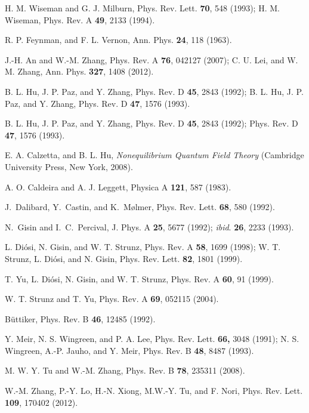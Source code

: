 \documentclass[preprint]{elsarticle}
\begin{document}
\begin{thebibliography}{10}
H. M. Wiseman and G. J. Milburn, Phys. Rev. Lett. \textbf{70},
548 (1993); H. M. Wiseman, Phys. Rev. A \textbf{49}, 2133 (1994).


R. P. Feynman, and F. L. Vernon, Ann. Phys.
\textbf{24}, 118 (1963).

J.-H. An and W.-M. Zhang, Phys. Rev. A \textbf{76},
042127 (2007); C. U. Lei, and W. M. Zhang, Ann. Phys. \textbf{327},
1408 (2012).

B. L. Hu, J. P. Paz, and Y. Zhang, Phys. Rev. D \textbf{45},
2843 (1992); B. L. Hu, J. P. Paz, and Y. Zhang, Phys. Rev. D \textbf{47},
1576 (1993).

B. L. Hu, J. P. Paz, and Y. Zhang, Phys. Rev. D \textbf{45},
2843 (1992); Phys. Rev. D \textbf{47}, 1576 (1993).

E. A. Calzetta, and B. L. Hu, \emph{Nonequilibrium Quantum
Field Theory} (Cambridge University Press, New York, 2008).

A. O. Caldeira and A. J. Leggett, Physica A \textbf{121},
587 (1983).

J.~Dalibard, Y.~Castin, and K.~M\o{}lmer,
Phys. Rev. Lett. \textbf{68}, 580 (1992).

N.~Gisin and I.~C.~Percival, J. Phys.
A \textbf{25}, 5677 (1992); \textit{ibid}. \textbf{26}, 2233 (1993).


L. Di\'{o}si, N. Gisin, and W. T. Strunz, Phys. Rev.
A \textbf{58}, 1699 (1998); W. T. Strunz, L. Di\'{o}si, and N. Gisin,
Phys. Rev. Lett. \textbf{82}, 1801 (1999).

T. Yu, L. Di\'{o}si, N. Gisin, and W. T. Strunz,
Phys. Rev. A \textbf{60}, 91 (1999).

W. T. Strunz and T. Yu, Phys. Rev. A \textbf{69},
052115 (2004).


B\"{u}ttiker, Phys. Rev. B \textbf{46}, 12485
(1992).

 Y. Meir, N. S. Wingreen, and P. A. Lee, Phys. Rev. Lett. {\bf 66,} 3048 (1991);
N. S. Wingreen, A.-P. Jauho, and Y. Meir, Phys. Rev.
B \textbf{48}, 8487 (1993).

M. W. Y. Tu and W.-M. Zhang, Phys. Rev. B \textbf{78},
235311 (2008).

W.-M. Zhang, P.-Y. Lo, H.-N. Xiong, M.W.-Y. Tu, and F. Nori, Phys. Rev. Lett. \textbf{109}, 170402
(2012).


\end{thebibliography}
\end{document}

